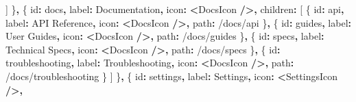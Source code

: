 \documentclass[
]{article}
\newenvironment{Shaded}{\begin{snugshade}}{\end{snugshade}}
\newcommand{\NormalTok}[1]{#1}
\newcommand{\OperatorTok}[1]{\textcolor[rgb]{0.81,0.36,0.00}{\textbf{#1}}}
\newcommand{\StringTok}[1]{\textcolor[rgb]{0.31,0.60,0.02}{#1}}
\begin{document}
\begin{Shaded}
\begin{Highlighting}[]
\NormalTok{    ]}
\NormalTok{  \}}\OperatorTok{,}
\NormalTok{  \{}
\NormalTok{    id}\OperatorTok{:} \StringTok{\textquotesingle{}docs\textquotesingle{}}\OperatorTok{,}
\NormalTok{    label}\OperatorTok{:} \StringTok{\textquotesingle{}Documentation\textquotesingle{}}\OperatorTok{,}
\NormalTok{    icon}\OperatorTok{:} \OperatorTok{\textless{}}\NormalTok{DocsIcon }\OperatorTok{/\textgreater{},}
\NormalTok{    children}\OperatorTok{:}\NormalTok{ [}
\NormalTok{      \{ id}\OperatorTok{:} \StringTok{\textquotesingle{}api\textquotesingle{}}\OperatorTok{,}\NormalTok{ label}\OperatorTok{:} \StringTok{\textquotesingle{}API Reference\textquotesingle{}}\OperatorTok{,}\NormalTok{ icon}\OperatorTok{:} \OperatorTok{\textless{}}\NormalTok{DocsIcon }\OperatorTok{/\textgreater{},}\NormalTok{ path}\OperatorTok{:} \StringTok{\textquotesingle{}/docs/api\textquotesingle{}}\NormalTok{ \}}\OperatorTok{,}
\NormalTok{      \{ id}\OperatorTok{:} \StringTok{\textquotesingle{}guides\textquotesingle{}}\OperatorTok{,}\NormalTok{ label}\OperatorTok{:} \StringTok{\textquotesingle{}User Guides\textquotesingle{}}\OperatorTok{,}\NormalTok{ icon}\OperatorTok{:} \OperatorTok{\textless{}}\NormalTok{DocsIcon }\OperatorTok{/\textgreater{},}\NormalTok{ path}\OperatorTok{:} \StringTok{\textquotesingle{}/docs/guides\textquotesingle{}}\NormalTok{ \}}\OperatorTok{,}
\NormalTok{      \{ id}\OperatorTok{:} \StringTok{\textquotesingle{}specs\textquotesingle{}}\OperatorTok{,}\NormalTok{ label}\OperatorTok{:} \StringTok{\textquotesingle{}Technical Specs\textquotesingle{}}\OperatorTok{,}\NormalTok{ icon}\OperatorTok{:} \OperatorTok{\textless{}}\NormalTok{DocsIcon }\OperatorTok{/\textgreater{},}\NormalTok{ path}\OperatorTok{:} \StringTok{\textquotesingle{}/docs/specs\textquotesingle{}}\NormalTok{ \}}\OperatorTok{,}
\NormalTok{      \{ id}\OperatorTok{:} \StringTok{\textquotesingle{}troubleshooting\textquotesingle{}}\OperatorTok{,}\NormalTok{ label}\OperatorTok{:} \StringTok{\textquotesingle{}Troubleshooting\textquotesingle{}}\OperatorTok{,}\NormalTok{ icon}\OperatorTok{:} \OperatorTok{\textless{}}\NormalTok{DocsIcon }\OperatorTok{/\textgreater{},}\NormalTok{ path}\OperatorTok{:} \StringTok{\textquotesingle{}/docs/troubleshooting\textquotesingle{}}\NormalTok{ \}}
\NormalTok{    ]}
\NormalTok{  \}}\OperatorTok{,}
\NormalTok{  \{}
\NormalTok{    id}\OperatorTok{:} \StringTok{\textquotesingle{}settings\textquotesingle{}}\OperatorTok{,}
\NormalTok{    label}\OperatorTok{:} \StringTok{\textquotesingle{}Settings\textquotesingle{}}\OperatorTok{,}
\NormalTok{    icon}\OperatorTok{:} \OperatorTok{\textless{}}\NormalTok{SettingsIcon }\OperatorTok{/\textgreater{},}

\end{Highlighting}
\end{Shaded}
\end{document}
